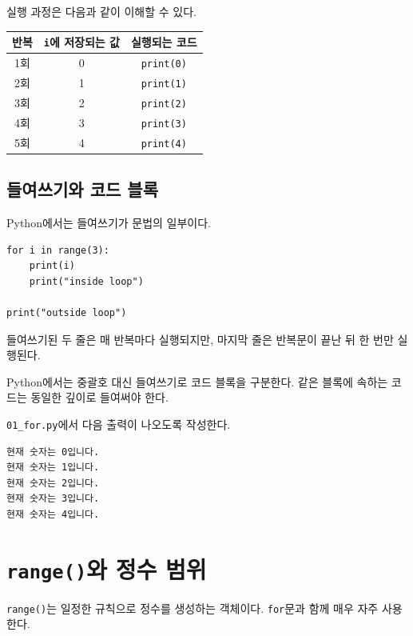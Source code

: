 \documentclass[11pt,a4paper]{article}
\begin{document}
실행 과정은 다음과 같이 이해할 수 있다.

\begin{center}
\begin{tabular}{ccc}
\toprule
반복 & \texttt{i}에 저장되는 값 & 실행되는 코드 \\
\midrule
1회 & 0 & \texttt{print(0)} \\
2회 & 1 & \texttt{print(1)} \\
3회 & 2 & \texttt{print(2)} \\
4회 & 3 & \texttt{print(3)} \\
5회 & 4 & \texttt{print(4)} \\
\bottomrule
\end{tabular}
\end{center}

\subsection{들여쓰기와 코드 블록}

Python에서는 들여쓰기가 문법의 일부이다.

\begin{lstlisting}
for i in range(3):
    print(i)
    print("inside loop")

print("outside loop")
\end{lstlisting}

들여쓰기된 두 줄은 매 반복마다 실행되지만, 마지막 줄은 반복문이 끝난 뒤 한 번만 실행된다.

\begin{importantbox}
Python에서는 중괄호 대신 들여쓰기로 코드 블록을 구분한다. 같은 블록에 속하는 코드는 동일한 깊이로 들여써야 한다.
\end{importantbox}

\begin{practicebox}
\texttt{01\_for.py}에서 다음 출력이 나오도록 작성한다.
\begin{verbatim}
현재 숫자는 0입니다.
현재 숫자는 1입니다.
현재 숫자는 2입니다.
현재 숫자는 3입니다.
현재 숫자는 4입니다.
\end{verbatim}
\end{practicebox}

\section{\texttt{range()}와 정수 범위}

\texttt{range()}는 일정한 규칙으로 정수를 생성하는 객체이다. \texttt{for}문과 함께 매우 자주 사용한다.
\end{document}
